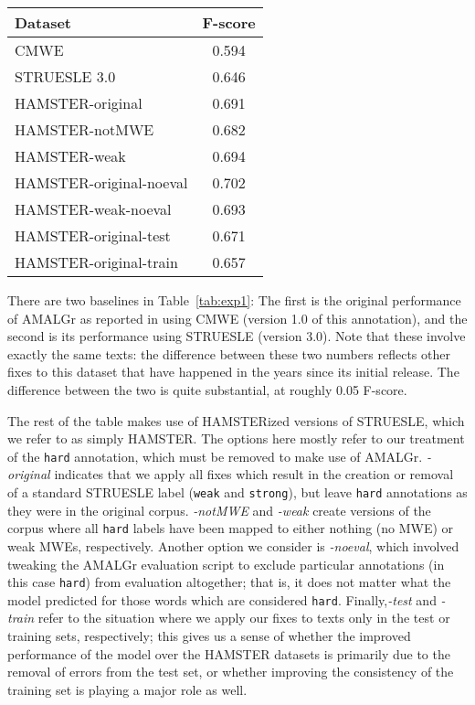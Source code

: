 \documentclass[output=paper
,modfonts
,nonflat]{langsci/langscibook}
\newcommand{\mwetype}[1]{\texttt{#1}\xspace}
\newcommand{\strongish}{\mwetype{strong}}
\newcommand{\weak}{\mwetype{weak}}
\newcommand{\hard}{\mwetype{hard}}
\newcommand{\tableref}[1]{Table~\ref{#1}\xspace}
\begin{document}
\begin{table*}[t!]
\caption{AMALGr F-scores for various versions of MWE annotation of EWT Reviews} %
\begin{tabular}{l c}
\toprule
\textbf{Dataset}&\textbf{F-score}\\
\midrule
CMWE \citep{Schneider14b} & 0.594\\
STRUESLE 3.0 & 0.646 \\
\midrule
HAMSTER-original & 0.691 \\ 
HAMSTER-notMWE & 0.682 \\
HAMSTER-weak & 0.694 \\
\midrule
HAMSTER-original-noeval & 0.702 \\
HAMSTER-weak-noeval & 0.693\\
\midrule
HAMSTER-original-test & 0.671\\
HAMSTER-original-train  & 0.657 \\

\bottomrule
\end{tabular}%
\label{tab:exp1} %
\end{table*}

There are two baselines in \tableref{tab:exp1}: The first is the original performance of AMALGr as reported in \citet{Schneider14b} using CMWE (version 1.0 of this annotation), and the second is its performance using STRUESLE (version 3.0). Note that these involve exactly the same texts: the difference between these two numbers reflects other fixes to this dataset that have happened in the years since its initial release. The difference between the two is quite substantial, at roughly 0.05 F-score.

The rest of the table makes use of HAMSTERized versions of STRUESLE, which we refer to as simply HAMSTER. The options here mostly refer to our treatment of the \hard annotation, which must be removed to make use of AMALGr. \emph{-original} indicates that we apply all fixes which result in the creation or removal of a standard STRUESLE label (\ie \weak and \strongish), but leave \hard annotations as they were in the original corpus. \emph{-notMWE} and \emph{-weak} create versions of the corpus where all \hard labels have been mapped to either nothing (no MWE) or weak MWEs, respectively. Another option we consider is \emph{-noeval}, which involved tweaking the AMALGr evaluation script to exclude particular annotations (in this case \hard) from evaluation altogether; that is, it does not matter what the model predicted for those words which are considered \hard. Finally,\emph{-test} and \emph{-train} refer to the situation where we apply our fixes to texts only in the test or training sets, respectively; this gives us a sense of whether the improved performance of the model over the HAMSTER datasets is primarily due to the removal of errors from the test set, or whether improving the consistency of the training set is playing a major role as well.
\end{document}
